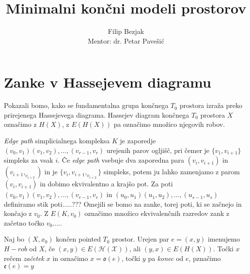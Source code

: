 \documentclass[a4paper,12pt]{article}
\title{Minimalni končni modeli prostorov}
\author{Filip Bezjak \\ Mentor: dr. Petar Pavešić}
\theoremstyle{definition}
\theoremstyle{plain}
\theoremstyle{plain}
\theoremstyle{definition}
\theoremstyle{plain}
\theoremstyle{plain}
\begin{document}
\section{Zanke v Hassejevem diagramu}

Pokazali bomo, kako se fundamentalna grupa končnega $T_0$ prostora izraža preko prirejenega Hassejevega diagrama.
Hassejev diagram končnega $T_0$ prostora $X$ označimo z $H(X)$, z $E(H(X))$ pa označimo množico njegovih robov.

\textit{Edge path} simplicialnega kompleksa $K$ je zaporedje
$(v_0,v_1)(v_1,v_2),...,(v_{r-1},v_{r})$ urejenih parov 
ogljišč, pri čemer je $\{v_1,v_{i+1}\}$ simpleks za vsak $i$. 
Če \textit{edge path} vsebuje dva zaporedna para 
$(v_i,v_{i+1})$ in $(v_{i+1},_v_{i+2})$ in je 
$\{v_i,v_{i+1},_v_{i+2}\}$ simpleks, potem ju lahko 
zamenjamo z parom $(v_i,v_{i+1})$ in dobimo ekvivalentno a 
krajšo pot. Za poti $(v_0,v_1)(v_1,v_2),...,(v_{r-1},v_{r})$ 
in $(u_0,u_1)(u_1,u_2),...,(u_{s-1},u_{s})$ definiramo stik 
poti.....???
Omejili se bomo na zanke, torej poti, ki se začnejo in končajo z $v_0$. Z $E(K,v_0)$ označimo množico ekvivalenčnih razredov zank z začetno točko $v_0$.....


Naj bo $(X,x_0)$ končen pointed $T_0$ prostor. Urejen par 
$e=(x,y)$ imenujemo $H-rob$ od $X$, če $(x,y)\in 
E(\mathcal{H}(\mathcal{X}))$, ali $(y,x)\in 
E(H(X))$. Točki $x$ rečem \textit{začetek} $x$ in označimo 
$x=\mathfrak{o}(e)$, točki $y$ pa \textit{konec} od $e$, 
pznačimo $\mathfrak{e}(e)=y$
\end{document}
